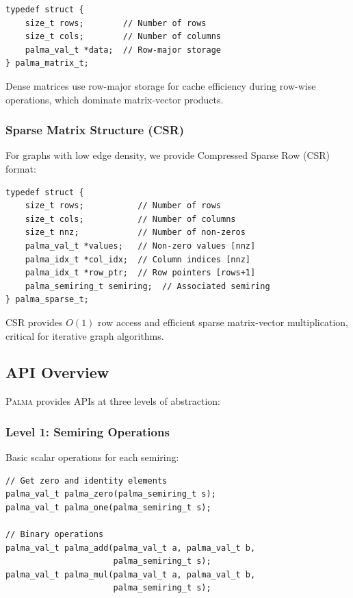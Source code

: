 \documentclass[11pt,a4paper]{article}
\theoremstyle{plain}
\theoremstyle{definition}
\newcommand{\palma}{\textsc{Palma}}
\begin{document}
\begin{lstlisting}[caption={Dense matrix structure}]
typedef struct {
    size_t rows;        // Number of rows
    size_t cols;        // Number of columns
    palma_val_t *data;  // Row-major storage
} palma_matrix_t;
\end{lstlisting}

Dense matrices use row-major storage for cache efficiency during row-wise operations, which dominate matrix-vector products.

\subsubsection{Sparse Matrix Structure (CSR)}

For graphs with low edge density, we provide Compressed Sparse Row (CSR) format:

\begin{lstlisting}[caption={CSR sparse matrix structure}]
typedef struct {
    size_t rows;           // Number of rows
    size_t cols;           // Number of columns
    size_t nnz;            // Number of non-zeros
    palma_val_t *values;   // Non-zero values [nnz]
    palma_idx_t *col_idx;  // Column indices [nnz]
    palma_idx_t *row_ptr;  // Row pointers [rows+1]
    palma_semiring_t semiring;  // Associated semiring
} palma_sparse_t;
\end{lstlisting}

CSR provides $O(1)$ row access and efficient sparse matrix-vector multiplication, critical for iterative graph algorithms.

\subsection{API Overview}

\palma{} provides APIs at three levels of abstraction:

\subsubsection{Level 1: Semiring Operations}

Basic scalar operations for each semiring:

\begin{lstlisting}[caption={Semiring operation API}]
// Get zero and identity elements
palma_val_t palma_zero(palma_semiring_t s);
palma_val_t palma_one(palma_semiring_t s);

// Binary operations
palma_val_t palma_add(palma_val_t a, palma_val_t b, 
                      palma_semiring_t s);
palma_val_t palma_mul(palma_val_t a, palma_val_t b, 
                      palma_semiring_t s);
\end{lstlisting}
\end{document}
